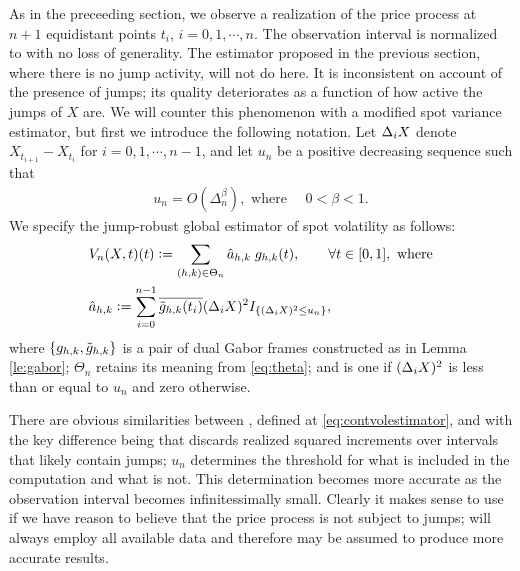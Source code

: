 As in the preceeding section, we observe a realization of the price process at $n + 1$ equidistant points $t_i$,  $i = 0, 1, \cdots, n$. The observation interval is normalized to \domain with  no loss of generality.  The estimator proposed in the previous section, where there is no jump activity, will not do here. It is inconsistent on account of the presence of jumps; its quality deteriorates as a function of how active the jumps of $X$ are. We will counter this phenomenon with a modified spot variance estimator, but first we introduce the following notation. Let $\Delta_i X$ denote $X_{t_{i+1}} - X_{t_i}$ for $i = 0, 1,\cdots, n-1$, and let $u_n$  be a positive decreasing sequence such that 
\begin{align}
  u_n  = O(\Delta_n^\beta), \text{ where }\quad 0< \beta < 1.  
  \label{}
\end{align}
 We specify the jump-robust global estimator of  spot volatility as follows: 
\begin{align}
  \label{eq:jumpvolestimator}
  &V_n(X, t)(t) := \sum_{(h,k) \in \Theta_n} \hat{a}_{h,k}\;g_{h,k}(t), \qquad \forall t \in [0,1], \text{ where}\\
  &\hat{a}_{h,k} := \sum_{i =0}^{n-1} \overline{\tilde{g}_{h,k}(t_i)} (\Delta_i X)^2 I_{\{(\Delta_i X)^2 \le u_n\}},
\end{align}
where $\{g_{h,k}, \tilde{g}_{h,k}\}$ is a pair of dual Gabor frames constructed as in Lemma \eqref{le:gabor}; $\Theta_n$ retains its meaning from \eqref{eq:theta}; and \indx is one if $(\Delta_i X)^2$ is less than or equal to  $u_n$ and zero otherwise.  


There are obvious similarities between \svnx, defined at  \eqref{eq:contvolestimator},  and \jvn with the key difference being that \jvn discards realized squared increments over intervals that likely contain jumps; $u_n$ determines the threshold for what is included in the computation and what is not. This determination becomes more accurate as the observation interval becomes infinitessimally small. Clearly it makes sense to use \svnx if we have reason to believe that the price process is not subject to jumps; \svnx will always employ   all available data and therefore may be assumed to produce more accurate results.  


